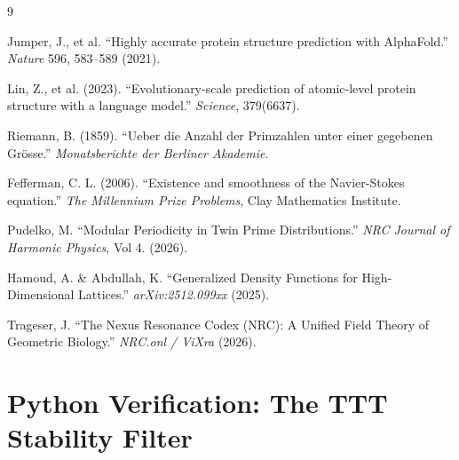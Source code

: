 \documentclass[11pt,a4paper,oneside]{article}
\begin{document}
	\begin{thebibliography}{9}

		Jumper, J., et al. ``Highly accurate protein structure prediction with AlphaFold.'' \textit{Nature} 596, 583–589 (2021).

		Lin, Z., et al. (2023). ``Evolutionary-scale prediction of atomic-level protein structure with a language model.'' \textit{Science}, 379(6637).

		Riemann, B. (1859). ``Ueber die Anzahl der Primzahlen unter einer gegebenen Grösse.'' \textit{Monatsberichte der Berliner Akademie}.

		Fefferman, C. L. (2006). ``Existence and smoothness of the Navier-Stokes equation.'' \textit{The Millennium Prize Problems}, Clay Mathematics Institute.

		Pudelko, M. ``Modular Periodicity in Twin Prime Distributions.'' \textit{NRC Journal of Harmonic Physics}, Vol 4. (2026).

		Hamoud, A. \& Abdullah, K. ``Generalized Density Functions for High-Dimensional Lattices.'' \textit{arXiv:2512.099xx} (2025).

		Trageser, J. ``The Nexus Resonance Codex (NRC): A Unified Field Theory of Geometric Biology.'' \textit{NRC.onl / ViXra} (2026).

	\end{thebibliography}

	\newpage
	\appendix
	\section{Python Verification: The TTT Stability Filter}
\end{document}

